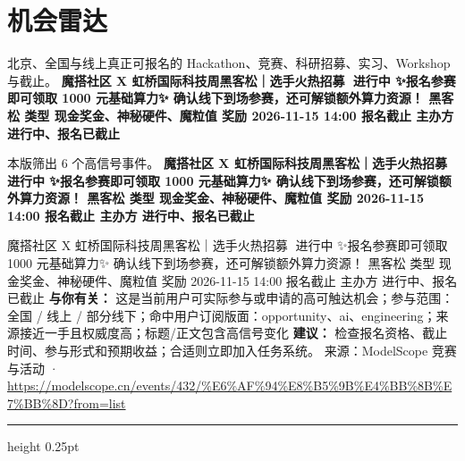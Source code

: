 \documentclass[10.5pt]{ctexart}
\begin{document}
\section*{机会雷达}
{\color{ormuted} 北京、全国与线上真正可报名的 Hackathon、竞赛、科研招募、实习、Workshop 与截止。}
\vspace{2mm}
{\LARGE\bfseries 魔搭社区 X 虹桥国际科技周黑客松｜选手火热招募🚀 进行中 ✨报名参赛即可领取 1000 元基础算力✨ 确认线下到场参赛，还可解锁额外算力资源！ 黑客松 类型 现金奖金、神秘硬件、魔粒值 奖励 2026-11-15 14:00 报名截止 主办方 进行中、报名已截止}\par
\vspace{1mm}
{\color{ormuted} 本版筛出 6 个高信号事件。}
\vspace{3mm}
{\Large\bfseries 魔搭社区 X 虹桥国际科技周黑客松｜选手火热招募🚀 进行中 ✨报名参赛即可领取 1000 元基础算力✨ 确认线下到场参赛，还可解锁额外算力资源！ 黑客松 类型 现金奖金、神秘硬件、魔粒值 奖励 2026-11-15 14:00 报名截止 主办方 进行中、报名已截止}\par
魔搭社区 X 虹桥国际科技周黑客松｜选手火热招募🚀 进行中 ✨报名参赛即可领取 1000 元基础算力✨ 确认线下到场参赛，还可解锁额外算力资源！ 黑客松 类型 现金奖金、神秘硬件、魔粒值 奖励 2026-11-15 14:00 报名截止 主办方 进行中、报名已截止
\textbf{与你有关：} 这是当前用户可实际参与或申请的高可触达机会；参与范围：全国 / 线上 / 部分线下；命中用户订阅版面：opportunity、ai、engineering；来源接近一手且权威度高；标题/正文包含高信号变化
\textbf{建议：} 检查报名资格、截止时间、参与形式和预期收益；合适则立即加入任务系统。
{\footnotesize\color{ormuted} 来源：ModelScope 竞赛与活动 · \url{https://modelscope.cn/events/432/%E6%AF%94%E8%B5%9B%E4%BB%8B%E7%BB%8D?from=list}}
\vspace{4mm}
\hrule height 0.25pt
\vspace{3mm}
\end{document}
